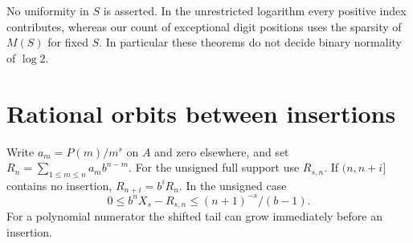 \documentclass[11pt]{article}
\begin{document}
No uniformity in \(S\) is asserted. In the unrestricted logarithm every positive index contributes, whereas our count of exceptional digit positions uses the sparsity of \(M(S)\) for fixed \(S\). In particular these theorems do not decide binary normality of \(\log 2\).

\section{Rational orbits between insertions}
Write \(a_m=P(m)/m^s\) on \(A\) and zero elsewhere, and set \(R_n=\sum_{1\le m\le n}a_m b^{n-m}\). For the unsigned full support use \(R_{s,n}\). If \((n,n+i]\) contains no insertion, \(R_{n+i}=b^iR_n\). In the unsigned case
\begin{equation}\label{eq:tail}
 0\le b^nX_s-R_{s,n}\le (n+1)^{-s}/(b-1).
\end{equation}
For a polynomial numerator the shifted tail can grow immediately before an insertion.
\end{document}
